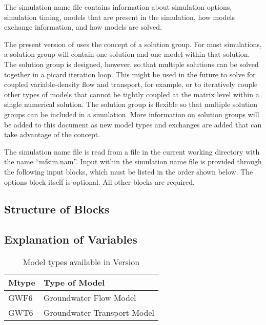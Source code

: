 The simulation name file contains information about simulation options, simulation timing, models that are present in the simulation, how models exchange information, and how models are solved.

The present version of \mf uses the concept of a solution group.  For most simulations, a solution group will contain one solution and one model within that solution.  The solution group is designed, however, so that multiple solutions can be solved together in a picard iteration loop.  This might be used in the future to solve for coupled variable-density flow and transport, for example, or to iteratively couple other types of models that cannot be tightly coupled at the matrix level within a single numerical solution.  The solution group is flexible so that multiple solution groups can be included in a simulation.  More information on solution groups will be added to this document as new model types and exchanges are added that can take advantage of the concept.

The simulation name file is read from a file in the current working directory with the name ``mfsim.nam''.  Input within the simulation name file is provided through the following input blocks, which must be listed in the order shown below.  The options block itself is optional.  All other blocks are required.

\vspace{5mm}
\subsection{Structure of Blocks}






\vspace{5mm}
\subsection{Explanation of Variables}
\begin{description}

\end{description}

\begin{table}[h]
\caption{Model types available in Version \modflowversion}
\small
\begin{center}
\begin{tabular*}{\columnwidth}{l l}
\hline
\hline
Mtype & Type of Model \\
\hline
GWF6 & Groundwater Flow Model \\
GWT6 & Groundwater Transport Model \\
\hline 
\end{tabular*}
\label{table:mtype}
\end{center}
\normalsize
\end{table}

